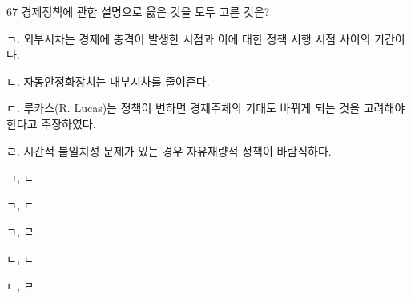 \begin{question}{67}
경제정책에 관한 설명으로 옳은 것을 모두 고른 것은?
\begin{framedtext}
ㄱ. 외부시차는 경제에 충격이 발생한 시점과 이에 대한 정책 시행 시점 사이의 기간이다. \par
ㄴ. 자동안정화장치는 내부시차를 줄여준다. \par
ㄷ. 루카스(R. Lucas)는 정책이 변하면 경제주체의 기대도 바뀌게 되는 것을 고려해야 한다고 주장하였다. \par
ㄹ. 시간적 불일치성 문제가 있는 경우 자유재량적 정책이 바람직하다. \par
\end{framedtext}
\begin{choices}
  \item ㄱ, ㄴ
  \item ㄱ, ㄷ
  \item ㄱ, ㄹ
  \item ㄴ, ㄷ
  \item ㄴ, ㄹ
\end{choices}
\end{question}
